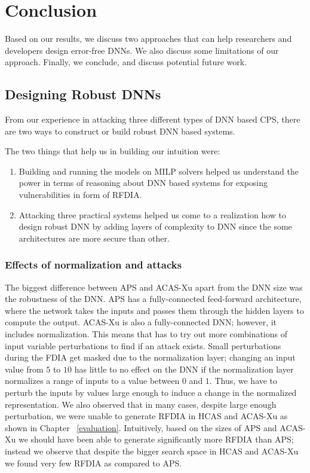 \chapter{Conclusion}
\label{conclusion}


Based on our results, we discuss two approaches that can help researchers and developers design error-free \ac{DNN}s. 
We also discuss some limitations of our approach.
Finally, we conclude, and discuss potential future work.


\section{Designing Robust DNNs}
From our experience in attacking three different types of \ac{DNN} based CPS, there are two ways to construct or build robust \ac{DNN} based systems.

The two things that help us in building our intuition were:
\begin{enumerate}
	\item Building and running the models on \ac{MILP} solvers helped us understand the power in terms of reasoning about \ac{DNN} based systems for exposing vulnerabilities in form of \ac{RFDIA}. 
	\item Attacking three practical systems helped us come to a realization how to design robust \ac{DNN} by adding layers of complexity to \ac{DNN} since the some architectures are more secure than other. 
\end{enumerate}


\subsection{Effects of normalization and attacks}
The biggest difference between \ac{APS} and \ac{ACAS-Xu} apart from the \ac{DNN} size was the robustness of the \ac{DNN}. 
\ac{APS} has a fully-connected feed-forward architecture, where the network takes the inputs and passes them through the hidden layers to compute the output. 
\ac{ACAS-Xu} is also a fully-connected \ac{DNN}; however, it includes normalization.
This means that \tool has to try out more combinations of input variable perturbations to find if an attack exists. 
Small perturbations during the \ac{FDIA} get masked due to the normalization layer; changing an input value from $5$ to $10$ has little to no effect on the \ac{DNN} if the normalization layer normalizes a range of inputs to a value between $0$ and $1$. 
Thus, we have to perturb the inputs by values large enough to induce a change in the normalized representation. 
We also observed that in many cases, despite large enough perturbation, we were unable to generate \ac{RFDIA} in \ac{HCAS} and \ac{ACAS-Xu} as shown in Chapter ~\ref{evaluation}.
Intuitively, based on the sizes of \ac{APS} and \ac{ACAS-Xu} we should have been able to generate significantly more \ac{RFDIA} than \ac{APS}; instead we observe that despite the bigger search space in \ac{HCAS} and \ac{ACAS-Xu} we found very few \ac{RFDIA} as compared to \ac{APS}. 


